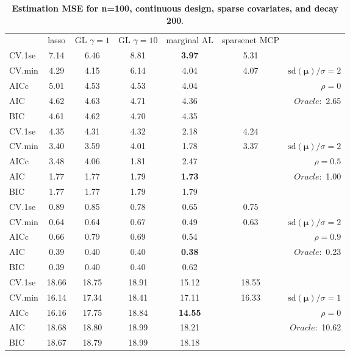 \clearpage
\begin{table}\vspace{-.5cm}
\caption[l]{ { \bf Estimation MSE for n=100, continuous design, 
sparse covariates, and  decay  200}.}
\vspace{-.5cm}
\footnotesize{}
\begin{center}
\begin{tabular}{l*{5}{c}|r}
& lasso & GL $\gamma=1$ & GL $\gamma=10$ & marginal AL & sparsenet MCP  & \\
 \cline{1-7}
CV.1se & 7.14 & 6.46 & 8.81 & {\bf 3.97} & 5.31 & \\
CV.min & 4.29 & 4.15 & 6.14 & 4.04 & 4.07 &  $\mathrm{sd}(\mathbf{\mu})/\sigma=2$ \\
AICc & 5.01 & 4.53 & 4.53 & 4.04 & & $\rho=0$ \\
AIC & 4.62 & 4.63 & 4.71 & 4.36 & &  \multirow{2}{*}{$Oracle: $ 2.65} \\
BIC & 4.61 & 4.62 & 4.70 & 4.35 & &  \\
 \hline 
CV.1se & 4.35 & 4.31 & 4.32 & 2.18 & 4.24 & \\
CV.min & 3.40 & 3.59 & 4.01 & 1.78 & 3.37 &  $\mathrm{sd}(\mathbf{\mu})/\sigma=2$ \\
AICc & 3.48 & 4.06 & 1.81 & 2.47 & & $\rho=0.5$ \\
AIC & 1.77 & 1.77 & 1.79 & {\bf 1.73} & &  \multirow{2}{*}{$Oracle: $ 1.00} \\
BIC & 1.77 & 1.77 & 1.79 & 1.79 & &  \\
 \hline 
CV.1se & 0.89 & 0.85 & 0.78 & 0.65 & 0.75 & \\
CV.min & 0.64 & 0.64 & 0.67 & 0.49 & 0.63 &  $\mathrm{sd}(\mathbf{\mu})/\sigma=2$ \\
AICc & 0.66 & 0.79 & 0.69 & 0.54 & & $\rho=0.9$ \\
AIC & 0.39 & 0.40 & 0.40 & {\bf 0.38} & &  \multirow{2}{*}{$Oracle: $ 0.23} \\
BIC & 0.39 & 0.40 & 0.40 & 0.62 & &  \\
 \hline 
CV.1se & 18.66 & 18.75 & 18.91 & 15.12 & 18.55 & \\
CV.min & 16.14 & 17.34 & 18.41 & 17.11 & 16.33 &  $\mathrm{sd}(\mathbf{\mu})/\sigma=1$ \\
AICc & 16.16 & 17.75 & 18.84 & {\bf 14.55} & & $\rho=0$ \\
AIC & 18.68 & 18.80 & 18.99 & 18.21 & &  \multirow{2}{*}{$Oracle: $ 10.62} \\
BIC & 18.67 & 18.79 & 18.99 & 18.18 & &  \\

\end{tabular}
\end{center}
\end{table}
